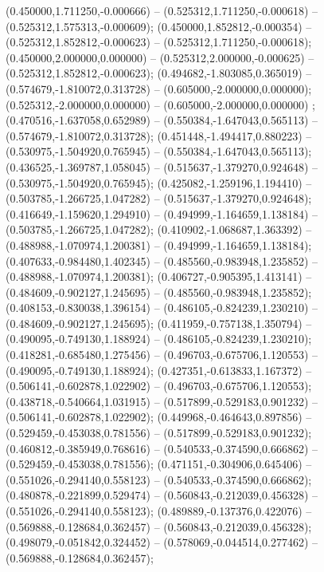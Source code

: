  (0.450000,1.711250,-0.000666) -- (0.525312,1.711250,-0.000618) -- (0.525312,1.575313,-0.000609);
 (0.450000,1.852812,-0.000354) -- (0.525312,1.852812,-0.000623) -- (0.525312,1.711250,-0.000618);
 (0.450000,2.000000,0.000000) -- (0.525312,2.000000,-0.000625) -- (0.525312,1.852812,-0.000623);
 (0.494682,-1.803085,0.365019) -- (0.574679,-1.810072,0.313728) -- (0.605000,-2.000000,0.000000);
 (0.525312,-2.000000,0.000000) -- (0.605000,-2.000000,0.000000) ;
 (0.470516,-1.637058,0.652989) -- (0.550384,-1.647043,0.565113) -- (0.574679,-1.810072,0.313728);
 (0.451448,-1.494417,0.880223) -- (0.530975,-1.504920,0.765945) -- (0.550384,-1.647043,0.565113);
 (0.436525,-1.369787,1.058045) -- (0.515637,-1.379270,0.924648) -- (0.530975,-1.504920,0.765945);
 (0.425082,-1.259196,1.194410) -- (0.503785,-1.266725,1.047282) -- (0.515637,-1.379270,0.924648);
 (0.416649,-1.159620,1.294910) -- (0.494999,-1.164659,1.138184) -- (0.503785,-1.266725,1.047282);
 (0.410902,-1.068687,1.363392) -- (0.488988,-1.070974,1.200381) -- (0.494999,-1.164659,1.138184);
 (0.407633,-0.984480,1.402345) -- (0.485560,-0.983948,1.235852) -- (0.488988,-1.070974,1.200381);
 (0.406727,-0.905395,1.413141) -- (0.484609,-0.902127,1.245695) -- (0.485560,-0.983948,1.235852);
 (0.408153,-0.830038,1.396154) -- (0.486105,-0.824239,1.230210) -- (0.484609,-0.902127,1.245695);
 (0.411959,-0.757138,1.350794) -- (0.490095,-0.749130,1.188924) -- (0.486105,-0.824239,1.230210);
 (0.418281,-0.685480,1.275456) -- (0.496703,-0.675706,1.120553) -- (0.490095,-0.749130,1.188924);
 (0.427351,-0.613833,1.167372) -- (0.506141,-0.602878,1.022902) -- (0.496703,-0.675706,1.120553);
 (0.438718,-0.540664,1.031915) -- (0.517899,-0.529183,0.901232) -- (0.506141,-0.602878,1.022902);
 (0.449968,-0.464643,0.897856) -- (0.529459,-0.453038,0.781556) -- (0.517899,-0.529183,0.901232);
 (0.460812,-0.385949,0.768616) -- (0.540533,-0.374590,0.666862) -- (0.529459,-0.453038,0.781556);
 (0.471151,-0.304906,0.645406) -- (0.551026,-0.294140,0.558123) -- (0.540533,-0.374590,0.666862);
 (0.480878,-0.221899,0.529474) -- (0.560843,-0.212039,0.456328) -- (0.551026,-0.294140,0.558123);
 (0.489889,-0.137376,0.422076) -- (0.569888,-0.128684,0.362457) -- (0.560843,-0.212039,0.456328);
 (0.498079,-0.051842,0.324452) -- (0.578069,-0.044514,0.277462) -- (0.569888,-0.128684,0.362457);
